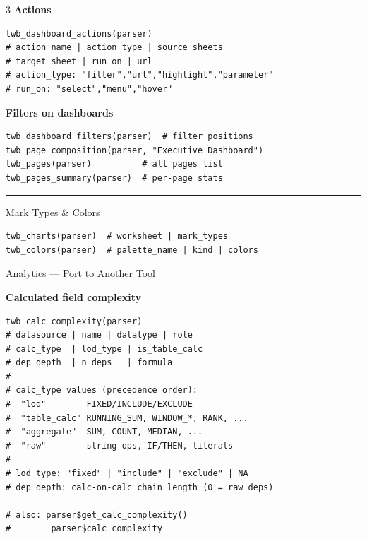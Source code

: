 \documentclass[10pt,landscape]{article}
\newcommand{\sep}{\vspace{1pt}\hrule\vspace{2pt}}
\begin{document}
\begin{multicols}{3}
\textbf{Actions}

\begin{lstlisting}
twb_dashboard_actions(parser)
# action_name | action_type | source_sheets
# target_sheet | run_on | url
# action_type: "filter","url","highlight","parameter"
# run_on: "select","menu","hover"
\end{lstlisting}

\textbf{Filters on dashboards}

\begin{lstlisting}
twb_dashboard_filters(parser)  # filter positions
twb_page_composition(parser, "Executive Dashboard")
twb_pages(parser)          # all pages list
twb_pages_summary(parser)  # per-page stats
\end{lstlisting}

\sep

\begin{secbox}[twbMid]{Mark Types \& Colors}
\end{secbox}

\begin{lstlisting}
twb_charts(parser)  # worksheet | mark_types
twb_colors(parser)  # palette_name | kind | colors
\end{lstlisting}

\columnbreak

\begin{secbox}[twbOrange]{Analytics — Port to Another Tool}
\end{secbox}

\textbf{Calculated field complexity}

\begin{lstlisting}
twb_calc_complexity(parser)
# datasource | name | datatype | role
# calc_type  | lod_type | is_table_calc
# dep_depth  | n_deps   | formula
#
# calc_type values (precedence order):
#  "lod"        FIXED/INCLUDE/EXCLUDE
#  "table_calc" RUNNING_SUM, WINDOW_*, RANK, ...
#  "aggregate"  SUM, COUNT, MEDIAN, ...
#  "raw"        string ops, IF/THEN, literals
#
# lod_type: "fixed" | "include" | "exclude" | NA
# dep_depth: calc-on-calc chain length (0 = raw deps)

# also: parser$get_calc_complexity()
#        parser$calc_complexity
\end{lstlisting}


\end{multicols}
\end{document}
